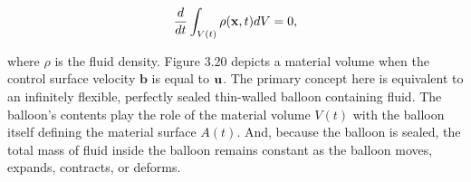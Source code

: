 \documentclass{article}
\begin{document}
$$
\frac{d}{dt} \int_{V(t)} \rho({\bf x},t) dV = 0,
$$

where $\rho$ is the fluid density. Figure 3.20 depicts a material volume when the control surface velocity $\textbf{b}$ is equal to ${\bf u}$. The primary concept here is equivalent to an infinitely flexible, perfectly sealed thin-walled balloon containing fluid. The balloon's contents play the role of the material volume $V(t)$ with the balloon itself defining the material surface $A(t)$. And, because the balloon is sealed, the total mass of fluid inside the balloon remains constant as the balloon moves, expands, contracts, or deforms.
\end{document}

